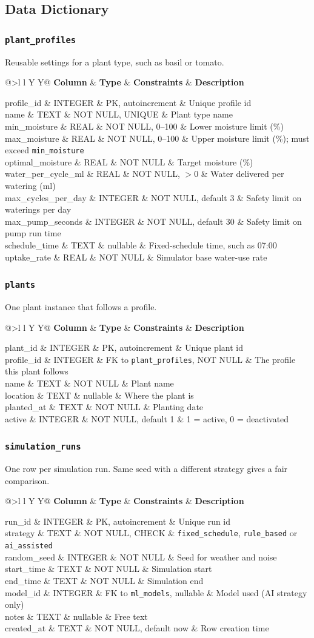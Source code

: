 \documentclass[11pt,a4paper]{article}
\makeatletter
\newcommand{\cn}[1]{\texttt{#1}}   %
\newcommand{\dbtable}[3]{%
  \Needspace{10\baselineskip}%
  \subsubsection*{\texttt{#1}}%
  #2\par\smallskip
  {\small
  \begin{tabularx}{\textwidth}{@{}>{\ttfamily}l l Y Y@{}}
    \toprule
    \textbf{Column} & \textbf{Type} & \textbf{Constraints} & \textbf{Description}\\
    \midrule
    #3
    \bottomrule
  \end{tabularx}}\par\bigskip}
\makeatother
\begin{document}
\subsection{Data Dictionary}

\dbtable{plant\_profiles}{Reusable settings for a plant type, such as basil or tomato.}{
  profile\_id & INTEGER & PK, autoincrement & Unique profile id\\
  name & TEXT & NOT NULL, UNIQUE & Plant type name\\
  min\_moisture & REAL & NOT NULL, 0--100 & Lower moisture limit (\%)\\
  max\_moisture & REAL & NOT NULL, 0--100 & Upper moisture limit (\%); must exceed \cn{min\_moisture}\\
  optimal\_moisture & REAL & NOT NULL & Target moisture (\%)\\
  water\_per\_cycle\_ml & REAL & NOT NULL, $>0$ & Water delivered per watering (ml)\\
  max\_cycles\_per\_day & INTEGER & NOT NULL, default 3 & Safety limit on waterings per day\\
  max\_pump\_seconds & INTEGER & NOT NULL, default 30 & Safety limit on pump run time\\
  schedule\_time & TEXT & nullable & Fixed-schedule time, such as 07:00\\
  uptake\_rate & REAL & NOT NULL & Simulator base water-use rate\\
}

\dbtable{plants}{One plant instance that follows a profile.}{
  plant\_id & INTEGER & PK, autoincrement & Unique plant id\\
  profile\_id & INTEGER & FK to \cn{plant\_profiles}, NOT NULL & The profile this plant follows\\
  name & TEXT & NOT NULL & Plant name\\
  location & TEXT & nullable & Where the plant is\\
  planted\_at & TEXT & NOT NULL & Planting date\\
  active & INTEGER & NOT NULL, default 1 & 1 = active, 0 = deactivated\\
}

\dbtable{simulation\_runs}{One row per simulation run. Same seed with a different strategy gives a fair comparison.}{
  run\_id & INTEGER & PK, autoincrement & Unique run id\\
  strategy & TEXT & NOT NULL, CHECK & \cn{fixed\_schedule}, \cn{rule\_based} or \cn{ai\_assisted}\\
  random\_seed & INTEGER & NOT NULL & Seed for weather and noise\\
  start\_time & TEXT & NOT NULL & Simulation start\\
  end\_time & TEXT & NOT NULL & Simulation end\\
  model\_id & INTEGER & FK to \cn{ml\_models}, nullable & Model used (AI strategy only)\\
  notes & TEXT & nullable & Free text\\
  created\_at & TEXT & NOT NULL, default now & Row creation time\\
}
\end{document}
